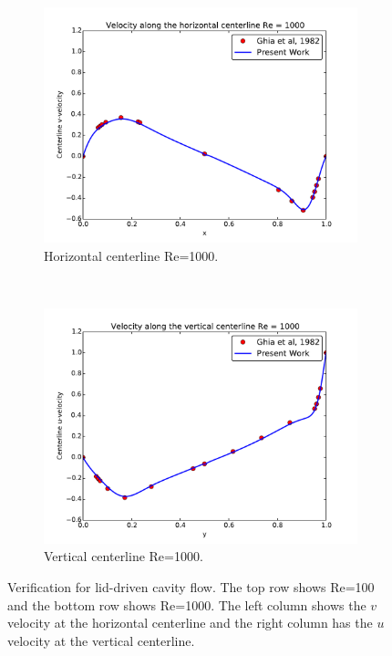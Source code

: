\begin{figure}[!htb]
	\begin{subfigure}{0.4\textwidth}
		\includegraphics[width=\linewidth]{ldc_horizontal_1000}
		\caption{Horizontal centerline Re=1000.}		
	\end{subfigure}
	~
	\begin{subfigure}{0.4\textwidth}
		\includegraphics[width=\linewidth]{ldc_vertical_1000}
		\caption{Vertical centerline Re=1000.}		
	\end{subfigure}
	\caption{Verification for lid-driven cavity flow. The top row shows Re=100 and the bottom row shows Re=1000. The left column shows the $v$ velocity at the horizontal centerline and the right column has the $u$ velocity at the vertical centerline.}
	\label{fig:ldc}
\end{figure}


